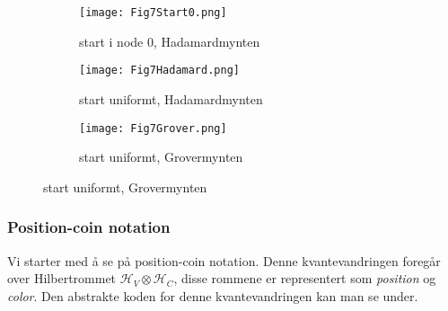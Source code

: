             \begin{figure}
                \begin{center}
                    \caption{Kvantevandring over \ref{fig:d-reg}}
                    \label{fig: d-reg vandring}
                    \begin{subfigure}{0.65\textwidth}
                        \begin{center}
                            \caption{start i node 0, Hadamardmynten}
                            \texttt{[image: Fig7Start0.png]}
                        \end{center}
                    \end{subfigure} 
                \end{center}
                \begin{center}
                    \begin{subfigure}{0.8\textwidth}
                        \begin{center}
                            \caption{start uniformt, Hadamardmynten}
                            \texttt{[image: Fig7Hadamard.png]}
                        \end{center}
                    \end{subfigure}
                \end{center}
                \begin{center}
                    \begin{subfigure}{0.8\textwidth}
                        \begin{center}
                            \caption{start uniformt, Grovermynten}
                            \texttt{[image: Fig7Grover.png]}                        
                        \end{center}
                    \end{subfigure}
                \end{center}
            \end{figure}

        \subsubsection{Position-coin notation}

            Vi starter med å se på position-coin notation. Denne kvantevandringen foregår over Hilbertrommet $\mathcal{H}_V\otimes \mathcal{H}_C$, disse rommene er representert som \emph{position} og \emph{color}. Den abstrakte koden for denne kvantevandringen kan man se under.

